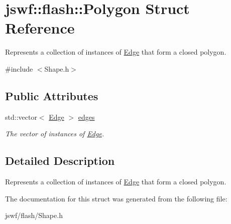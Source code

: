 \hypertarget{structjswf_1_1flash_1_1_polygon}{\section{jswf\+:\+:flash\+:\+:Polygon Struct Reference}
\label{structjswf_1_1flash_1_1_polygon}
}


Represents a collection of instances of \hyperlink{structjswf_1_1flash_1_1_edge}{Edge} that form a closed polygon.  




{\ttfamily \#include $<$Shape.\+h$>$}

\subsection*{Public Attributes}
\begin{DoxyCompactItemize}
\item 
\hypertarget{structjswf_1_1flash_1_1_polygon_a79b41bd5bb2e2c9b1506a7637699acbd}{std\+::vector$<$ \hyperlink{structjswf_1_1flash_1_1_edge}{Edge} $>$ \hyperlink{structjswf_1_1flash_1_1_polygon_a79b41bd5bb2e2c9b1506a7637699acbd}{edges}}\label{structjswf_1_1flash_1_1_polygon_a79b41bd5bb2e2c9b1506a7637699acbd}

\begin{DoxyCompactList}\small\item\em The {\ttfamily vector} of instances of \hyperlink{structjswf_1_1flash_1_1_edge}{Edge}. \end{DoxyCompactList}\end{DoxyCompactItemize}


\subsection{Detailed Description}
Represents a collection of instances of \hyperlink{structjswf_1_1flash_1_1_edge}{Edge} that form a closed polygon. 

The documentation for this struct was generated from the following file\+:\begin{DoxyCompactItemize}
\item 
jswf/flash/Shape.\+h\end{DoxyCompactItemize}
